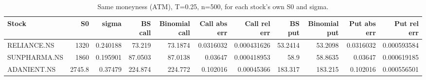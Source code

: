 \begin{table}
\centering
\small
\caption{Same moneyness (ATM), T=0.25, n=500, for each stock's own S0 and sigma.}
\label{tab:e6_stocks}
\begin{adjustbox}{max width=\textwidth}
\begin{tabular}{lrrrrrrrrrr}
\toprule
Stock & S0 & sigma & BS call & Binomial call & Call abs err & Call rel err & BS put & Binomial put & Put abs err & Put rel err \\
\midrule
RELIANCE.NS & 1320 & 0.240188 & 73.219 & 73.1874 & 0.0316032 & 0.000431626 & 53.2414 & 53.2098 & 0.0316032 & 0.000593584 \\
SUNPHARMA.NS & 1860 & 0.195901 & 87.0503 & 87.0138 & 0.03647 & 0.000418953 & 58.9 & 58.8635 & 0.03647 & 0.000619185 \\
ADANIENT.NS & 2745.8 & 0.37479 & 224.874 & 224.772 & 0.102016 & 0.00045366 & 183.317 & 183.215 & 0.102016 & 0.000556501 \\
\bottomrule
\end{tabular}
\end{adjustbox}
\end{table}
